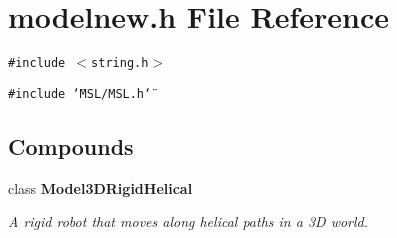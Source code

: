 \section{modelnew.h File Reference}
\label{modelnew_h}
{\tt \#include $<$string.h$>$}\par
{\tt \#include \char`\"{}MSL/MSL.h\char`\"{}}\par
\subsection*{Compounds}
\begin{CompactItemize}
\item 
class {\bf Model3DRigid\-Helical}
\begin{CompactList}\small\item\em A rigid robot that moves along helical paths in a 3D world.\item\end{CompactList}\end{CompactItemize}
